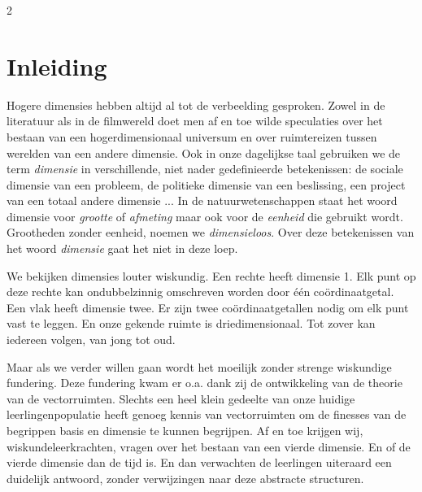 \begin{multicols}{2}                      
\inhoudstafelLoep		                  %



\section{Inleiding}

Hogere dimensies hebben altijd al tot de verbeelding gesproken. Zowel in de literatuur als in de filmwereld doet men af en toe wilde speculaties over het bestaan van een hogerdimensionaal universum en over ruimtereizen tussen werelden van een andere dimensie. Ook in onze dagelijkse taal gebruiken we de term \emph{dimensie} in verschillende, niet nader gedefinieerde betekenissen: de sociale dimensie van een probleem, de politieke dimensie van een beslissing, een project van een totaal andere dimensie ... In de natuurwetenschappen staat het woord dimensie voor \emph{grootte} of \emph{afmeting} maar ook voor de \emph{eenheid} die gebruikt wordt. Grootheden zonder eenheid, noemen we \emph{dimensieloos}. Over deze betekenissen van het woord \emph{dimensie} gaat het niet in deze loep.

We bekijken dimensies louter wiskundig. Een rechte heeft dimensie 1. Elk punt op deze rechte kan ondubbelzinnig omschreven worden door één coördinaatgetal. Een vlak heeft dimensie twee. Er zijn twee coördinaatgetallen nodig om elk punt vast te leggen. En onze gekende ruimte is driedimensionaal. Tot zover kan iedereen volgen, van jong tot oud. 

Maar als we verder willen gaan wordt het moeilijk zonder strenge wiskundige fundering. Deze fundering kwam er o.a. dank zij de ontwikkeling van de theorie van de vectorruimten. Slechts een heel klein gedeelte van onze huidige leerlingenpopulatie heeft genoeg kennis van vectorruimten om de finesses van de begrippen basis en dimensie te kunnen begrijpen. Af en toe krijgen wij, wiskundeleerkrachten, vragen over het bestaan van een vierde dimensie. En of de vierde dimensie dan de tijd is. En dan verwachten de leerlingen uiteraard een duidelijk antwoord, zonder verwijzingen naar deze abstracte structuren.


\end{multicols}
